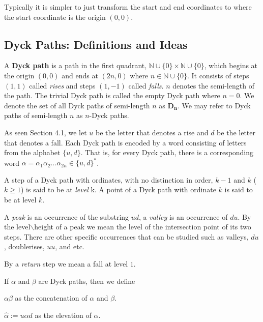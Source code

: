 \documentclass[12pt]{article}
\theoremstyle{definition}
\numberwithin{equation}{section}
\newcommand{\N}{\ensuremath{\mathbb{N}}}
\newcommand{\set}[1]{\{#1\}}
\begin{document}
Typically it is simpler to just transform the start and end coordinates to where the start coordinate is the origin $(0,0)$.


\subsection{Dyck Paths: Definitions and Ideas}

A \textbf{Dyck path} is a path in the first quadrant, $\N\cup \set{0}\times \N\cup \set{0}$,  which begins at the origin $(0,0)$ and ends at $(2n,0)$ where $n\in \N\cup \set{0}$. It consists of steps $(1,1)$ called \emph{rises} and steps $(1,-1)$ called \emph{falls}. $n$ denotes the semi-length of the path. The trivial Dyck path is called the empty Dyck path where $n=0$. We denote the set of all Dyck paths of semi-length $n$ as $\mathbf{D_n}$. We may refer to Dyck paths of semi-length $n$ as $n$-Dyck paths.\smallskip

As seen Section 4.1, we let $u$ be the letter that denotes a rise and $d$ be the letter that denotes a fall. Each Dyck path is encoded by a word consisting of letters from the alphabet $\set{u,d}$. That is, for every Dyck path, there is a corresponding word $\alpha = \alpha_1\alpha_2\ldots\alpha_{2n}\in\set{u,d}^* $.

A step of a Dyck path with ordinates, with no distinction in order, $k-1$ and $k$ ($k\geq 1$) is said to be at \emph{level} k. A point of a Dyck path with ordinate $k$ is said to be at level $k$.

A \emph{peak} is an occurrence of the substring $ud$, a \emph{valley} is an occurrence of $du$. %
By the level$\backslash$height of a peak we mean the level of the intersection point of its two steps. There are other specific occurrences that can be studied such as valleys, $du$, doublerises, $uu$, and etc.

By a \emph{return} step we mean a fall at level $1$. %

If $\alpha$ and $\beta$ are Dyck paths, then we define

\hspace{10pt} $\alpha\beta$ as the concatenation of $\alpha$ and $\beta$.

\hspace{10pt} $\hat{\alpha} := u\alpha d $ as the elevation of $\alpha$.
\end{document}
